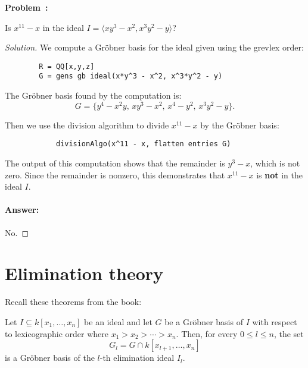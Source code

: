 \documentclass[12pt]{article}
\newcounter{algorithm}
\newcounter{problem}
\newenvironment{problem}[1][Problem]{%
	\refstepcounter{problem}%
	\noindent\textbf{\color{magenta}#1~\theproblem: }%
}{}
\newenvironment{solution}
    {\renewcommand{\qedsymbol}{}\begin{proof}[Solution]}
    {\end{proof}}
\begin{document}
\begin{problem}
Is $x^{11} - x$ in the ideal $I = \langle xy^3 - x^2,x^3y^2-y \rangle$?
\end{problem}

\begin{solution}

	We compute a Gr\"obner basis for the ideal given using the grevlex order:
	\begin{verbatim}
        R = QQ[x,y,z]
        G = gens gb ideal(x*y^3 - x^2, x^3*y^2 - y)
        \end{verbatim}

	The Gr\"obner basis found by the computation is:
	\[
		G = \{ y^4 - x^2y, \, xy^3 - x^2, \, x^4 - y^2, \, x^3y^2 - y \}.
	\]

	Then we use the division algorithm to divide $x^{11} - x$ by the Gr\"obner basis:
	\begin{verbatim}
            divisionAlgo(x^11 - x, flatten entries G)
        \end{verbatim}

	The output of this computation shows that the remainder is $y^3 - x$, which is not zero. Since the remainder is nonzero, this demonstrates that $x^{11} - x$ is \textbf{not} in the ideal $I$.

	\paragraph{Answer:} No.
\end{solution}

\section{Elimination theory}
Recall these theorems from the book:

\begin{theorem}
	Let \( I \subseteq k[x_1, \ldots, x_n] \) be an ideal and let \( G \) be a Gr\"obner basis of \( I \) with respect to lexicographic order where \( x_1 > x_2 > \cdots > x_n \). Then, for every \( 0 \leq l \leq n \), the set
	\[
		G_l = G \cap k[x_{l+1}, \ldots, x_n]
	\]
	is a Gr\"obner basis of the \( l \)-th elimination ideal \( I_l \).
\end{theorem}
\end{document}
